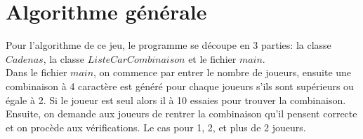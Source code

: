 \documentclass{article}
\begin{document}
	\part{Algorithme générale}
	
	Pour l'algorithme de ce jeu, le programme se découpe en 3 parties: la classe $Cadenas$, la classe $ListeCarCombinaison$ et le fichier $main$. \\
	
	Dans le fichier $main$, on commence par entrer le nombre de joueurs, ensuite une combinaison à 4 caractère est généré pour chaque joueurs s'ils sont supérieurs ou égale à 2. Si le joueur est seul alors il à 10 essaies pour trouver la combinaison. Ensuite, on demande aux joueurs de rentrer la combinaison qu'il pensent correcte et on procède aux vérifications. Le cas pour 1, 2, et plus de 2 joueurs.
	
\end{document}
